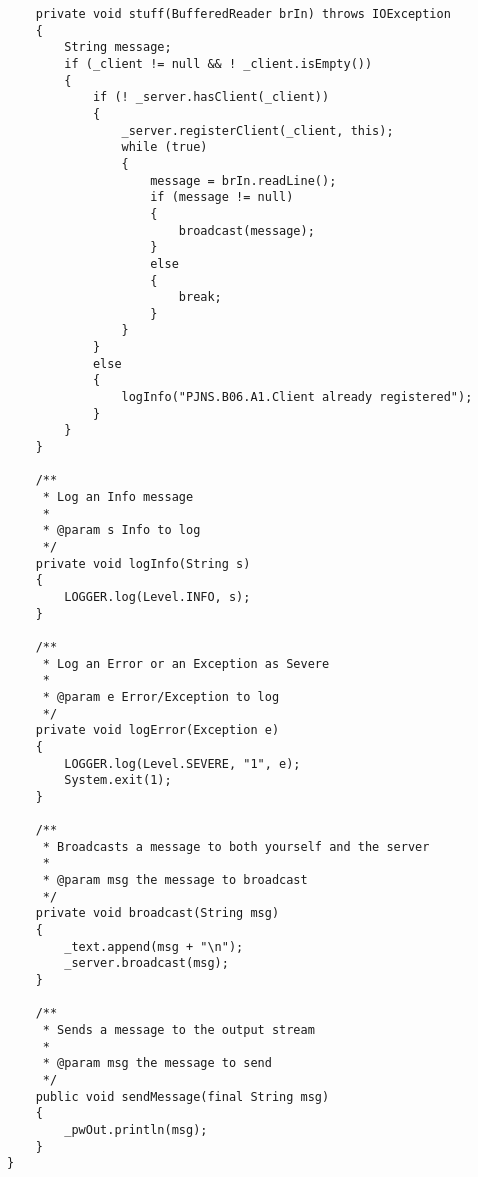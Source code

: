 \documentclass[twoside]{article}
\begin{document}
\begin{lstlisting}
    private void stuff(BufferedReader brIn) throws IOException
    {
        String message;
        if (_client != null && ! _client.isEmpty())
        {
            if (! _server.hasClient(_client))
            {
                _server.registerClient(_client, this);
                while (true)
                {
                    message = brIn.readLine();
                    if (message != null)
                    {
                        broadcast(message);
                    }
                    else
                    {
                        break;
                    }
                }
            }
            else
            {
                logInfo("PJNS.B06.A1.Client already registered");
            }
        }
    }

    /**
     * Log an Info message
     *
     * @param s Info to log
     */
    private void logInfo(String s)
    {
        LOGGER.log(Level.INFO, s);
    }

    /**
     * Log an Error or an Exception as Severe
     *
     * @param e Error/Exception to log
     */
    private void logError(Exception e)
    {
        LOGGER.log(Level.SEVERE, "1", e);
        System.exit(1);
    }

    /**
     * Broadcasts a message to both yourself and the server
     *
     * @param msg the message to broadcast
     */
    private void broadcast(String msg)
    {
        _text.append(msg + "\n");
        _server.broadcast(msg);
    }

    /**
     * Sends a message to the output stream
     *
     * @param msg the message to send
     */
    public void sendMessage(final String msg)
    {
        _pwOut.println(msg);
    }
}
		\end{lstlisting}
\end{document}
